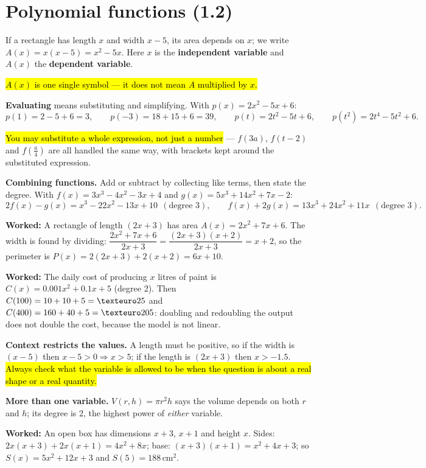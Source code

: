 \documentclass[11pt]{article}
\newcommand{\key}[1]{\hl{#1}}
\newcommand{\wex}[1]{\textbf{\color{lilacdeep}Worked:} #1}
\begin{document}
\section{Polynomial functions (1.2)}

If a rectangle has length $x$ and width $x-5$, its area depends on $x$; we write $A(x)=x(x-5)=x^{2}-5x$. Here $x$ is the \textbf{independent variable} and $A(x)$ the \textbf{dependent variable}.

\key{\mbox{$A(x)$} is one single symbol --- it does not mean \mbox{$A$} multiplied by \mbox{$x$}.}

\textbf{Evaluating} means substituting and simplifying. With $p(x)=2x^{2}-5x+6$:
\[p(1)=2-5+6=3,\qquad p(-3)=18+15+6=39,\qquad p(t)=2t^{2}-5t+6,\qquad p(t^{2})=2t^{4}-5t^{2}+6.\]

\key{You may substitute a whole expression, not just a number} --- $f(3a)$, $f(t-2)$ and $f\!\left(\frac a4\right)$ are all handled the same way, with brackets kept around the substituted expression.

\textbf{Combining functions.} Add or subtract by collecting like terms, then state the degree. With $f(x)=3x^{3}-4x^{2}-3x+4$ and $g(x)=5x^{3}+14x^{2}+7x-2$:
\[2f(x)-g(x)=x^{3}-22x^{2}-13x+10\ \ (\text{degree }3),\qquad f(x)+2g(x)=13x^{3}+24x^{2}+11x\ \ (\text{degree }3).\]

\wex{A rectangle of length $(2x+3)$ has area $A(x)=2x^{2}+7x+6$. The width is found by dividing: $\dfrac{2x^{2}+7x+6}{2x+3}=\dfrac{(2x+3)(x+2)}{2x+3}=x+2$, so the perimeter is $P(x)=2(2x+3)+2(x+2)=6x+10$.}

\wex{The daily cost of producing $x$ litres of paint is $C(x)=0.001x^{2}+0.1x+5$ (degree 2). Then $C(100)=10+10+5=\texteuro 25$ and $C(400)=160+40+5=\texteuro 205$: doubling and redoubling the output does not double the cost, because the model is not linear.}

\textbf{Context restricts the values.} A length must be positive, so if the width is $(x-5)$ then $x-5>0\Rightarrow x>5$; if the length is $(2x+3)$ then $x>-1.5$. \key{Always check what the variable is allowed to be when the question is about a real shape or a real quantity.}

\textbf{More than one variable.} $V(r,h)=\pi r^{2}h$ says the volume depends on both $r$ and $h$; its degree is 2, the highest power of \emph{either} variable.

\wex{An open box has dimensions $x+3$, $x+1$ and height $x$. Sides: $2x(x+3)+2x(x+1)=4x^{2}+8x$; base: $(x+3)(x+1)=x^{2}+4x+3$; so $S(x)=5x^{2}+12x+3$ and $S(5)=188\,\text{cm}^{2}$.}
\end{document}
